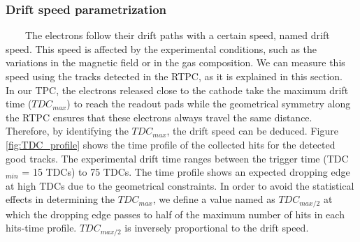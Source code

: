 \subsubsection{Drift speed parametrization}
~~~~The electrons follow their drift paths with a certain speed, named drift 
speed. This speed is affected by the experimental conditions, such as the 
variations in the magnetic field or in the gas composition. We can measure this 
speed using the tracks detected in the RTPC, as it is explained in this 
section.\\


In our TPC, the electrons released close to the cathode take the maximum drift 
time ($TDC_{max}$) to reach the readout pads while the geometrical symmetry 
along the RTPC ensures that these electrons always travel the same distance.  
Therefore, by identifying the $TDC_{max}$, the drift speed can be deduced.  
Figure \ref{fig:TDC_profile} shows the time profile of the collected hits for 
the detected good tracks. The experimental drift time ranges between the 
trigger time (TDC$_{min}$ = 15 TDCs) to 75 TDCs. The time profile shows an 
expected dropping edge at high TDCs due to the geometrical constraints. In 
order to avoid the statistical effects in determining the  $TDC_{max}$, we 
define a value named as $TDC_{max/2}$ at which the dropping edge passes to half 
of the maximum number of hits in each hits-time profile. $TDC_{max/2}$ is 
inversely proportional to the drift speed.\\
 

